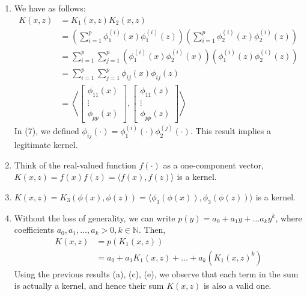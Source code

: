 \begin{answer}
\begin{enumerate}
\item We have as follows:
\begin{align}
	K(x,z)
	&= K_1(x,z) K_2(x,z) \\
	&= \left( \sum \limits_{i=1}^{p} \phi_1^{(i)}(x)\phi_1^{(i)}(z) \right) \left( \sum 
	\limits_{i=1}^{p} \phi_2^{(i)}(x)\phi_2^{(i)}(z) \right) \\
	&= \sum \limits_{i=1}^{p} \sum \limits_{j=1}^{p} \left(\phi_1^{(i)}(x) 
	\phi_2^{(i)}(x)\right) \left(\phi_1^{(i)}(z) \phi_2^{(i)}(z)\right) \\
	&= \sum \limits_{i=1}^{p} \sum \limits_{j=1}^{p} \phi_{ij}(x)\phi_{ij}(z) \\
	&= \left\langle
	\begin{bmatrix}
		\phi_{11}(x) \\
		\vdots \\
		\phi_{pp}(x)
	\end{bmatrix},
	\begin{bmatrix}
		\phi_{11}(z) \\
		\vdots \\
		\phi_{pp}(z)
	\end{bmatrix}
	\right\rangle
\end{align}
In (7), we defined $\phi_{ij}(\cdot) = \phi_1^{(i)}(\cdot)\phi_2^{(j)}(\cdot)$. This 
result implies a legitimate kernel.

\item Think of the real-valued function $f(\cdot)$ as a one-component vector, $K(x,z) = f(x)f(z) = \langle f(x),f(z) \rangle$ is a kernel.

\item $K(x,z) = K_3(\phi(x),\phi(z)) = \langle \phi_3(\phi(x)), \phi_3(\phi(z)) \rangle$ is a kernel.

\item Without the loss of generality, we can write $p(y) = a_0 + a_{1}y + \dots a_{k}y^k$, where coefficients $a_0, a_1, \dots, a_k > 0, k \in \mathbb{N}$. Then,
\begin{align}
	K(x,z) 
	&= p(K_1(x,z)) \\
	&= a_0 + a_{1}K_1(x,z) + \dots + a_{k}(K_1(x,z)^k)
\end{align}
Using the previous results (a), (c), (e), we observe that each term in the sum is actually a kernel, and hence their sum $K(x,z)$ is also a valid one. \\
\end{enumerate}
\end{answer}


















